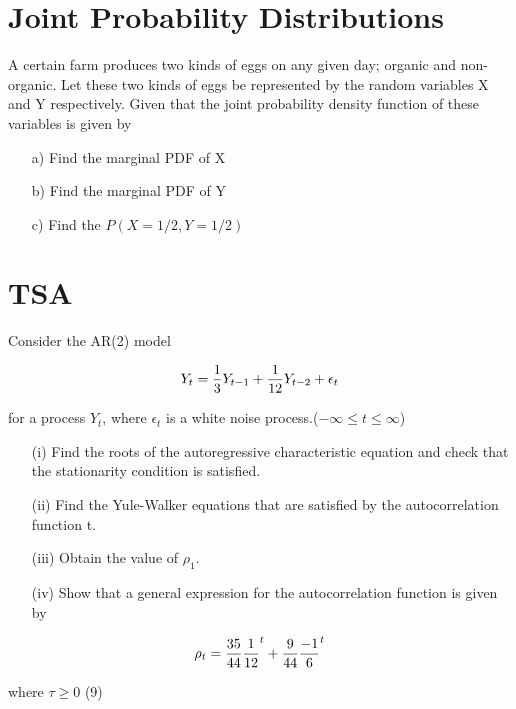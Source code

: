 

\section{Joint Probability Distributions}	
A certain farm produces two kinds of eggs on any given day; organic and non-organic. 
Let these two kinds of eggs be represented by the random variables X and Y respectively. 
Given that the joint probability density function of these variables is given by


\begin{itemize}
	\item[a)] Find the marginal PDF of X
	
	\item[b)] Find the marginal PDF of Y
	
	\item[c)] Find the $P(X = 1/2, Y = 1/2)$
\end{itemize}


%	
%		
\section{TSA}
Consider the AR(2) model


\[Y_t={1\over 3}Y_{t-1}+{1\over 12}Y_{t-2}+ \epsilon_t\]

for a process $Y_t$, where {$\epsilon_t$} is a white noise process.($-\infty \leq t \leq \infty$)

\begin{itemize}
	\item[(i)] Find the roots of the autoregressive characteristic equation and check that the stationarity condition is satisfied.
	
	\item[(ii)] Find the Yule-Walker equations that are satisfied by the autocorrelation function t.
	
	\item[(iii)] Obtain the value of $\rho_1$.
	
	\item[(iv)] Show that a general expression for the autocorrelation function is given by
\end{itemize}
\[\rho_t={35\over 44}{1\over 12}^t +{9\over 44}{-1\over 6}^t
\]

where $\tau \geq 0$     (9)



